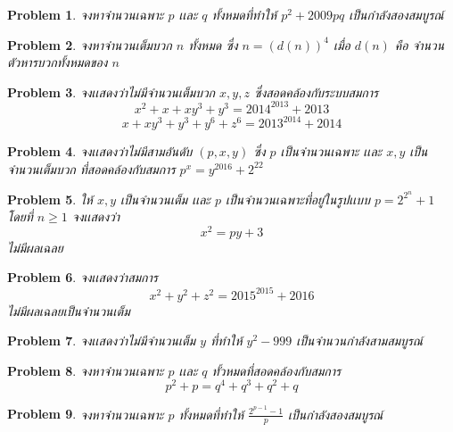 \documentclass[a4paper,12pt]{article}
\newtheorem{problem}{Problem}[section]
\begin{document}
\begin{problem}
	จงหาจำนวนเฉพาะ $p$ เเละ $q$ ทั้งหมดที่ทำให้ $p^2+2009pq$ เป็นกำลังสองสมบูรณ์
\end{problem}
\begin{problem}
	จงหาจำนวนเต็มบวก $n$ ทั้งหมด ซึ่ง $n = (d(n))^4$ เมื่อ $d(n)$ คือ จำนวนตัวหารบวกทั้งหมดของ $n$
\end{problem}
\begin{problem}
	จงเเสดงว่าไม่มีจำนวนเต็มบวก $x,y,z$ ซึ่งสอดคล้องกับระบบสมการ \[ x^2+x+xy^3+y^3 =2014^{2013}+2013 \]
\[ x+xy^3+y^3+y^6+z^6= 2013^{2014}+2014 \]
\end{problem}
\begin{problem}
	จงเเสดงว่าไม่มีสามอันดับ $(p,x,y)$ ซึ่ง $p$ เป็นจำนวนเฉพาะ เเละ $x,y$ เป็นจำนวนเต็มบวก ที่สอดคล้องกับสมการ $p^x=y^{2016}+2^{22}$
\end{problem}
\begin{problem}
	ให้ $x,y$ เป็นจำนวนเต็ม เเละ $p$ เป็นจำนวนเฉพาะที่อยู่ในรูปเเบบ $p=2^{2^n}+1 $โดยที่ $n \ge 1$ จงเเสดงว่า \[ x^2=py+3 \] ไม่มีผลเฉลย
\end{problem}
\begin{problem}
	จงเเสดงว่าสมการ \[ x^2+y^2+z^2 = 2015^{2015}+2016 \] ไม่มีผลเฉลยเป็นจำนวนเต็ม
\end{problem}

\begin{problem}
	จงเเสดงว่าไม่มีจำนวนเต็ม $y$ ที่ทำให้ $y^2-999$ เป็นจำนวนกำลังสามสมบูรณ์
\end{problem}
\begin{problem}
	จงหาจำนวนเฉพาะ $p$ เเละ $q$ ทั้วหมดที่สอดคล้องกับสมการ \[ p^2+p = q^4+q^3+q^2+q \]
\end{problem}
\begin{problem}
	จงหาจำนวนเฉพาะ $p$ ทั้งหมดที่ทำให้ $\frac{2^{p-1}-1}{p}$ เป็นกำลังสองสมบูรณ์
\end{problem}
\end{document}
